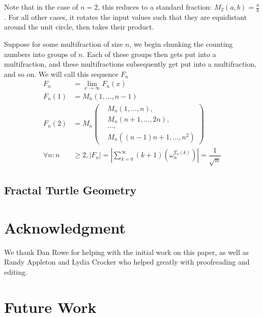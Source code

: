 \documentclass[conference]{IEEEtran}
\begin{document}
Note that in the case of $n=2$, this reduces to a standard fraction: $M_2(a, b) = \tfrac{a}{b}$. For all other cases, it rotates the input values such that they are equidistant around the unit circle, then takes their product.

\begin{conjecture}
\label{conj:maresh_multifraction}
Suppose for some multifraction of size $n$, we begin chunking the counting numbers into groups of $n$. Each of these groups then gets put into a multifraction, and these multifractions subsequently get put into a multifraction, and so on. We will call this sequence $F_n$
\begin{equation}
\begin{aligned}
   F_n &= \lim_{x\to\infty} F_n(x) \\
F_n(1) &= M_n(1, \ldots, n-1) \\
F_n(2) &= M_n\left(\begin{aligned}
        &M_n(1, \ldots, n), \\
        &M_n(n+1, \ldots, 2n),\\ 
        &\ldots, \\
        &M_n((n-1)n+1, \ldots, n^2)
\end{aligned}\right)\\
   \forall n: n &\ge 2, |F_n| = \left| \sum_{k=0}^\infty (k+1)(\omega_n^{T_n(k)}) \right| = \dfrac{1}{\sqrt{n}}
\end{aligned}
\end{equation}
\end{conjecture}

\subsection{Fractal Turtle Geometry}


\section{Acknowledgment}

We thank Dan Rowe for helping with the initial work on this paper, as well as Randy Appleton and Lydia Crocker who helped greatly with proofreading and editing.

\section{Future Work}
\end{document}
